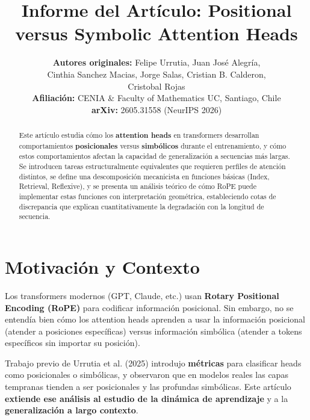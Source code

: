 \documentclass[conference]{IEEEtran}
\begin{document}
\title{Informe del Artículo: Positional versus Symbolic Attention Heads}

\author{
    \textbf{Autores originales:} Felipe Urrutia, Juan Jos\'e Alegr\'ia,\\
    Cinthia Sanchez Macias, Jorge Salas, Cristian B. Calderon,\\
    Cristobal Rojas\\
    \textbf{Afiliaci\'on:} CENIA \& Faculty of Mathematics UC, Santiago, Chile\\
    \textbf{arXiv:} 2605.31558 (NeurIPS 2026)
}

\maketitle

\begin{abstract}
Este art\'iculo estudia c\'omo los \textbf{attention heads} en transformers desarrollan comportamientos \textbf{posicionales} versus \textbf{simb\'olicos} durante el entrenamiento, y c\'omo estos comportamientos afectan la capacidad de generalizaci\'on a secuencias m\'as largas. Se introducen tareas estructuralmente equivalentes que requieren perfiles de atenci\'on distintos, se define una descomposici\'on mecanicista en funciones b\'asicas (Index, Retrieval, Reflexive), y se presenta un an\'alisis te\'orico de c\'omo RoPE puede implementar estas funciones con interpretaci\'on geom\'etrica, estableciendo cotas de discrepancia que explican cuantitativamente la degradaci\'on con la longitud de secuencia.
\end{abstract}

\section{Motivaci\'on y Contexto}

Los transformers modernos (GPT, Claude, etc.) usan \textbf{Rotary Positional Encoding (RoPE)} para codificar informaci\'on posicional. Sin embargo, no se entend\'ia bien c\'omo los attention heads aprenden a usar la informaci\'on posicional (atender a posiciones espec\'ificas) versus informaci\'on simb\'olica (atender a tokens espec\'ificos sin importar su posici\'on).

Trabajo previo de Urrutia et al. (2025) introdujo \textbf{m\'etricas} para clasificar heads como posicionales o simb\'olicas, y observaron que en modelos reales las capas tempranas tienden a ser posicionales y las profundas simb\'olicas. Este art\'iculo \textbf{extiende ese an\'alisis al estudio de la din\'amica de aprendizaje} y a la \textbf{generalizaci\'on a largo contexto}.
\end{document}
